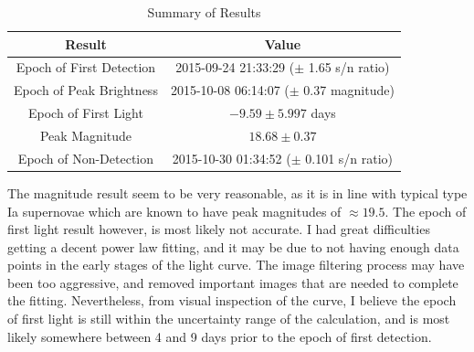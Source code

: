 \documentclass{article}
\begin{document}
\begin{table}[H]
    \centering
    \begin{tabular}{|c|c|}
        \hline
        \textbf{Result} & \textbf{Value} \\
        \hline
        Epoch of First Detection & 2015-09-24 21:33:29 ($\pm$ 1.65 s/n ratio)\\
        \hline
        Epoch of Peak Brightness &  2015-10-08 06:14:07 ($\pm$ 0.37 magnitude)\\
        \hline
        Epoch of First Light &  $-9.59 \pm 5.997$ days\\
        \hline
        Peak Magnitude & $18.68 \pm 0.37$ \\
        \hline
        Epoch of Non-Detection & 2015-10-30 01:34:52 ($\pm$ 0.101 s/n ratio)\\
        \hline
    \end{tabular}
    \caption{Summary of Results}
    \label{tab:results}
\end{table}

The magnitude result seem to be very reasonable, as it is in line with typical type Ia supernovae which are known to have peak magnitudes of $\approx 19.5$. The epoch of first light result however, is most likely not accurate. I had 
great difficulties getting a decent power law fitting, and it may be due to not having enough data points in the early stages of the light curve. The image filtering process may have been too aggressive, and removed important images that are needed
to complete the fitting. Nevertheless, from visual inspection of the curve, I believe the epoch of first light is still within the uncertainty range of the calculation, and is most likely somewhere between 4 and 9 days prior to the epoch of first detection.

\newpage

\appendix
\end{document}
